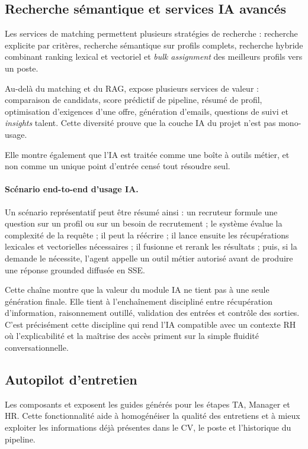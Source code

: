 \subsection{Recherche sémantique et services IA avancés}
Les services de matching permettent plusieurs stratégies de recherche : recherche explicite par critères, recherche sémantique sur profils complets, recherche hybride combinant ranking lexical et vectoriel et \textit{bulk assignment} des meilleurs profils vers un poste.

Au-delà du matching et du RAG,  expose plusieurs services de valeur : comparaison de candidats, score prédictif de pipeline, résumé de profil, optimisation d'exigences d'une offre, génération d'emails, questions de suivi et \textit{insights} talent. Cette diversité prouve que la couche IA du projet n'est pas mono-usage.

Elle montre également que l'IA est traitée comme une boîte à outils métier, et non comme un unique point d'entrée censé tout résoudre seul.
\paragraph{Scénario end-to-end d'usage IA.}
Un scénario représentatif peut être résumé ainsi : un recruteur formule une question sur un profil ou sur un besoin de recrutement ; le système évalue la complexité de la requête ; il peut la réécrire ; il lance ensuite les récupérations lexicales et vectorielles nécessaires ; il fusionne et rerank les résultats ; puis, si la demande le nécessite, l'agent appelle un outil métier autorisé avant de produire une réponse grounded diffusée en SSE.

Cette chaîne montre que la valeur du module IA ne tient pas à une seule génération finale. Elle tient à l'enchaînement discipliné entre récupération d'information, raisonnement outillé, validation des entrées et contrôle des sorties. C'est précisément cette discipline qui rend l'IA compatible avec un contexte RH où l'explicabilité et la maîtrise des accès priment sur la simple fluidité conversationnelle.


\subsection{Autopilot d'entretien}
Les composants  et  exposent les guides générés pour les étapes TA, Manager et HR. Cette fonctionnalité aide à homogénéiser la qualité des entretiens et à mieux exploiter les informations déjà présentes dans le CV, le poste et l'historique du pipeline.

